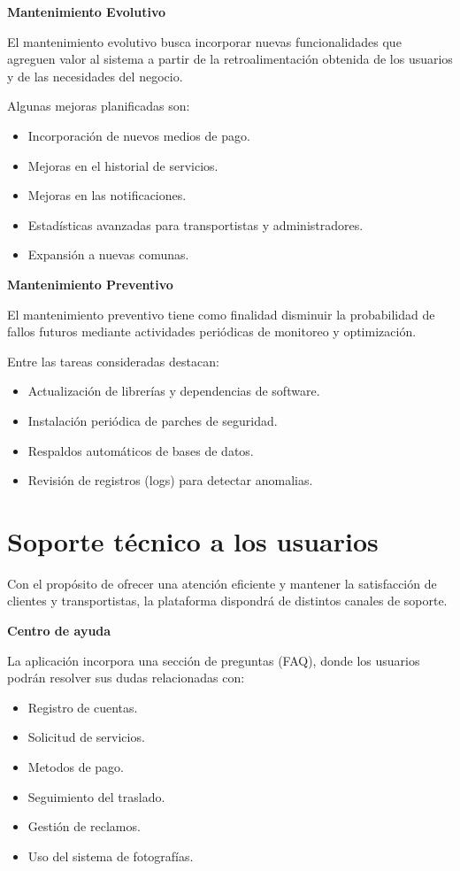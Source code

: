 \noindent \textbf{Mantenimiento Evolutivo} 

El mantenimiento evolutivo busca incorporar nuevas funcionalidades que agreguen valor al sistema a partir de la retroalimentación obtenida de los usuarios y de las necesidades del negocio.

Algunas mejoras planificadas son:

\begin{itemize}
	\item Incorporación de nuevos medios de pago.
	\item Mejoras en el historial de servicios.
	\item Mejoras en las notificaciones.
	\item Estadísticas avanzadas para transportistas y administradores.
	\item Expansión a nuevas comunas.
\end{itemize}


\noindent\textbf{Mantenimiento Preventivo}

El mantenimiento preventivo tiene como finalidad disminuir la probabilidad de fallos futuros mediante actividades periódicas de monitoreo y optimización.

Entre las tareas consideradas destacan:

\begin{itemize}
	\item Actualización de librerías y dependencias de software.
	\item Instalación periódica de parches de seguridad.
	\item Respaldos automáticos de bases de datos.
	\item Revisión de registros (logs) para detectar anomalias.
\end{itemize}


\section{Soporte técnico a los usuarios}

Con el propósito de ofrecer una atención eficiente y mantener la satisfacción de clientes y transportistas, la plataforma dispondrá de distintos canales de soporte.

\noindent\textbf{Centro de ayuda}

La aplicación incorpora una sección de preguntas (FAQ), donde los usuarios podrán resolver sus dudas relacionadas con:

\begin{itemize}
	\item Registro de cuentas.
	\item Solicitud de servicios.
	\item Metodos de pago.
	\item Seguimiento del traslado.
	\item Gestión de reclamos.
	\item Uso del sistema de fotografías.
\end{itemize}

